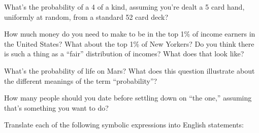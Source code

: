 \documentclass[addpoints,12pt]{exam}
\begin{document}
\begin{questions}

\question[2] What's the probability of a 4 of a kind, assuming you're dealt a 5 card hand, uniformly at random, from a standard 52 card deck?


\question[1] How much money do you need to make to be in the top 1\% of income earners in the United States? What about the top 1\% of New Yorkers? Do you think there is such a thing as a ``fair'' distribution of incomes? What does that look like?


\question[1] What's the probability of life on Mars? What does this question illustrate about the different meanings of the term ``probability''?

%
\question[1] How many people should you date before settling down on ``the one,'' assuming that's something you want to do?


\question[6] Translate each of the following symbolic expressions into English statements:

\noaddpoints
{}
\addpoints


\end{questions}
\end{document}
